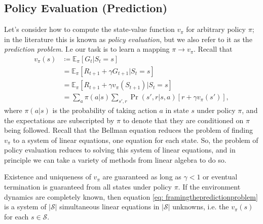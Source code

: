\documentclass[12pt]{article}
\begin{document}
\subsection{Policy Evaluation (Prediction)} Let's consider how to compute the state-value function $v_\pi$ for arbitrary policy $\pi$; in the literature this is known as \emph{policy evaluation}, but we also refer to it as the \emph{prediction problem}. I.e our task is to learn a mapping $\pi \longrightarrow v_\pi$. Recall that
\begin{align}
  v_\pi(s) &\coloneqq \mathbb E_\pi \left[ G_t | S_t = s \right] \nonumber \\
           &= \mathbb E_\pi \left[ R_{t+1} + \gamma G_{t+1} | S_t = s \right] \nonumber  \\
           &= \mathbb E_\pi \left[ R_{t+1} + \gamma v_\pi(S_{t+1}) | S_t = s                           \right] \nonumber  \\
  \label{eq: framingthepredictionproblem}
           &= \sum_a \pi(a|s) \sum_{s', r} \Pr(s',r|s,a) \left[ r + \gamma v_\pi(s')\right],
\end{align}
where $\pi(a|s)$ is the probability of taking action $a$ in state $s$ under policy $\pi$, and the expectations are subscripted by $\pi$ to denote that they are conditioned on $\pi$ being followed. Recall that the Bellman equation reduces the problem of finding $v_\pi$ to a system of linear equations, one equation for each state. So, the problem of policy evaluation reduces to solving this system of linear equations, and in principle we can take a variety of methods from linear algebra to do so.

\begin{figure}[h]
  \centering
\end{figure}

Existence and uniqueness of $v_\pi$ are guaranteed as long as $\gamma < 1$ or eventual termination is guaranteed from all states under policy $\pi$. If the environment dynamics are completely known, then equation \ref{eq: framingthepredictionproblem} is a system of $|\mathcal S|$ simultaneous linear equations in $|\mathcal S|$ unknowns, i.e. the $v_\pi(s)$ for each $s \in \mathcal S$.
\end{document}
